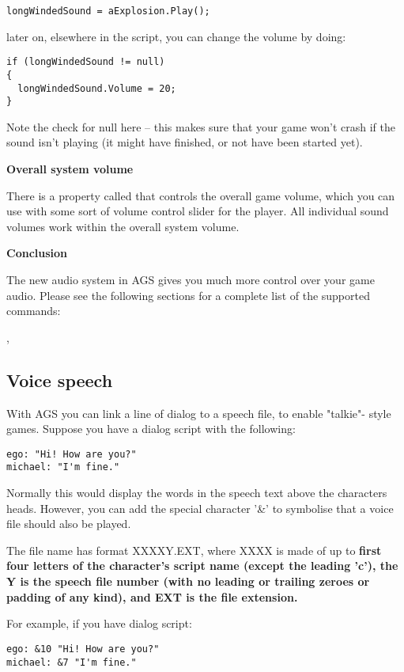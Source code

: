 \verb$longWindedSound = aExplosion.Play();$

later on, elsewhere in the script, you can change the volume by doing:
\begin{verbatim}
if (longWindedSound != null)
{
  longWindedSound.Volume = 20;
}
\end{verbatim}
Note the check for null here -- this makes sure that your game won't crash if the sound isn't
playing (it might have finished, or not have been started yet).

\bf{Overall system volume}

There is a property called  that controls the
overall game volume, which you can use with some sort of volume control slider for the
player. All individual sound volumes work within the overall system volume.

\bf{Conclusion}

The new audio system in AGS gives you much more control over your game audio.
Please see the following sections for a complete list of the supported commands:

,


\subsection{Voice speech}\label{VoiceSpeech}%

With AGS you can link a line of dialog to a speech file, to enable "talkie"-
style games. Suppose you have a dialog script with the following:
\begin{verbatim}
ego: "Hi! How are you?"
michael: "I'm fine."
\end{verbatim}
Normally this would display the words in the speech text above the characters
heads. However, you can add the special character '&' to symbolise that a
voice file should also be played.

The file name has format XXXXY.EXT, where XXXX is made of up to \bf{first four
letters} of the character's script name (except the leading 'c'), the Y is the speech
file number (with no leading or trailing zeroes or padding of any kind), and EXT is the file extension.

For example, if you have dialog script:
\begin{verbatim}
ego: &10 "Hi! How are you?"
michael: &7 "I'm fine."
\end{verbatim}

